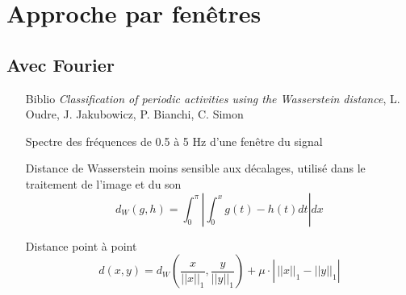 \documentclass{beamer}
\begin{document}
\section{Approche par fenêtres}
\subsection{Avec Fourier}

\begin{frame}
\begin{itemize}
\item[Biblio] \emph{Classification of periodic activities using the Wasserstein distance}, L. Oudre, J. Jakubowicz, P. Bianchi, C. Simon

\item[Spectre] des fréquences de 0.5 à 5 Hz d'une fenêtre du signal

\item[Distance] de Wasserstein moins sensible aux décalages, utilisé dans le traitement de l'image et du son
\[d_W(g,h)=\int_0^\pi\left|\int_0^xg(t)-h(t)dt\right|dx\]

\item[Distance] point à point
\[d(x,y)=d_W(\frac x{||x||_1},\frac y{||y||_1})+\mu\cdot\left|\phantom{\frac{}{}}||x||_1-||y||_1\right|\]
\end{itemize}
\end{frame}
\end{document}
